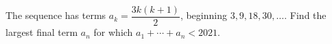 The sequence has terms $a_k=\dfrac{3 k(k+1)}{2}$, beginning $3,9,18,30,\ldots$. Find the largest final term $a_n$ for which $a_1+\cdots+a_n<2021$.

